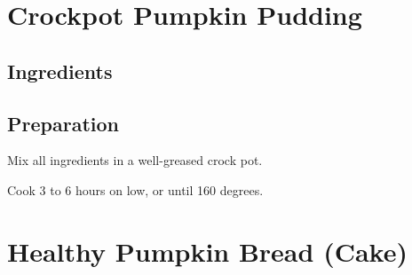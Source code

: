 \documentclass[letterpaper,10pt,english]{sphinxmanual}
\begin{document}


\chapter{Crockpot Pumpkin Pudding}
\label{\detokenize{Crockpot_Pumpkin_P:crockpot-pumpkin-pudding}}\label{\detokenize{Crockpot_Pumpkin_P::doc}}

\section{Ingredients}
\label{\detokenize{Crockpot_Pumpkin_P:ingredients}}
%
\begin{sphinxVerbatim}[commandchars=\\\{\}]
   

   

  

   

  

   

     

  
\end{sphinxVerbatim}


\section{Preparation}
\label{\detokenize{Crockpot_Pumpkin_P:preparation}}
Mix all ingredients in a well-greased crock pot.

Cook 3 to 6 hours on low, or until 160 degrees.


\chapter{Healthy Pumpkin Bread (Cake)}
\label{\detokenize{Pumpkin_Bread:healthy-pumpkin-bread-cake}}\label{\detokenize{Pumpkin_Bread::doc}}
\end{document}
